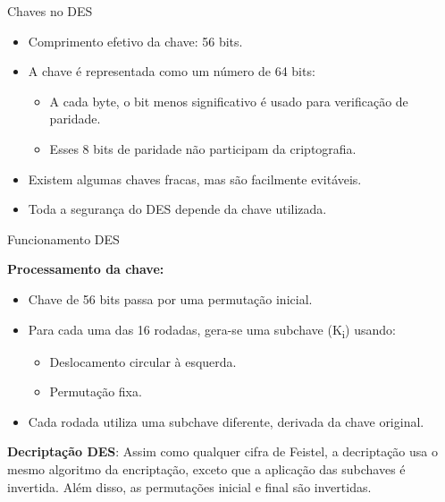 \begin{frame}{Chaves no DES}
    \begin{itemize}
        \item Comprimento efetivo da chave: 56 bits.
        \item A chave é representada como um número de 64 bits:
              \begin{itemize}
                  \item A cada byte, o bit menos significativo é usado para verificação de paridade.
                  \item Esses 8 bits de paridade não participam da criptografia.
              \end{itemize}
        \item Existem algumas chaves fracas, mas são facilmente evitáveis.
        \item Toda a segurança do DES depende da chave utilizada.
    \end{itemize}
\end{frame}


\begin{frame}{Funcionamento DES}




    \vspace{0.3cm}
    \textbf{Processamento da chave:}
    \begin{itemize}
        \item Chave de 56 bits passa por uma permutação inicial.
        \item Para cada uma das 16 rodadas, gera-se uma subchave (K\textsubscript{i}) usando:
              \begin{itemize}
                  \item Deslocamento circular à esquerda.
                  \item Permutação fixa.
              \end{itemize}
        \item Cada rodada utiliza uma subchave diferente, derivada da chave original.
    \end{itemize}

    \textbf{Decriptação DES}:
    Assim como qualquer cifra de Feistel, a decriptação usa o mesmo algoritmo da encriptação, exceto que a
    aplicação das subchaves é invertida. Além disso, as permutações inicial e final são invertidas.
\end{frame}

